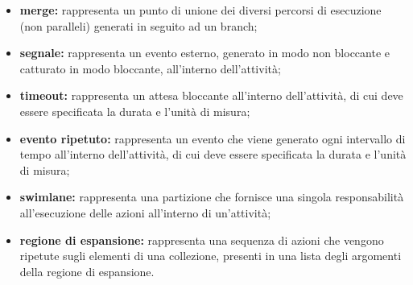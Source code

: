 \begin{itemize}[leftmargin=1.5cm]
							\item \textbf{merge:} rappresenta un punto di unione dei diversi percorsi di esecuzione (non paralleli) generati in seguito ad un branch;
							\item \textbf{segnale:} rappresenta un evento esterno, generato in modo non bloccante e catturato in modo bloccante, all'interno dell'attività;
							\item \textbf{timeout:} rappresenta un attesa bloccante all'interno dell'attività, di cui deve essere specificata la durata e l'unità di misura;
							\item \textbf{evento ripetuto:} rappresenta un evento che viene generato ogni intervallo di tempo all'interno dell'attività, di cui deve essere specificata la durata e l'unità di misura;
							\item \textbf{swimlane:} rappresenta una partizione che fornisce una singola responsabilità all'esecuzione delle azioni all'interno di un'attività;
							\item \textbf{regione di espansione:} rappresenta una sequenza di azioni che vengono ripetute sugli elementi di una collezione, presenti in una lista degli argomenti della regione di espansione.
						\end{itemize}

